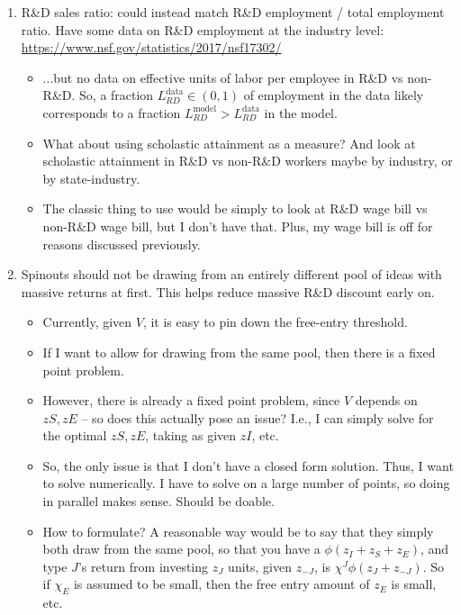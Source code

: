\documentclass[12pt,english]{article}
\theoremstyle{remark}
\begin{document}
\begin{enumerate}
	\item R\&D sales ratio: could instead match R\&D employment / total employment ratio. Have some data on R\&D employment at the industry level: \linebreak \href{https://www.nsf.gov/statistics/2017/nsf17302/}{https://www.nsf.gov/statistics/2017/nsf17302/}
	\begin{itemize}
		\item ...but no data on effective units of labor per employee in R\&D vs non-R\&D. So, a fraction $L_{RD}^{\textrm{data}} \in (0,1)$ of employment in the data likely corresponds to a fraction $L_{RD}^{\textrm{model}} > L_{RD}^{\textrm{data}}$ in the model.
		\item What about using scholastic attainment as a measure? And look at scholastic attainment in R\&D vs non-R\&D workers maybe by industry, or by state-industry. 
		\item The classic thing to use would be simply to look at R\&D wage bill vs non-R\&D wage bill, but I don't have that. Plus, my wage bill is off for reasons discussed previously.
	\end{itemize}
	\item Spinouts should not be drawing from an entirely different pool of ideas with massive returns at first. This helps reduce massive R\&D discount early on.
	\begin{itemize}
		\item Currently, given $V$, it is easy to pin down the free-entry threshold. 
		\item If I want to allow for drawing from the same pool, then there is a fixed point problem.
		\item However, there is already a fixed point problem, since $V$ depends on $zS,zE$ -- so does this actually pose an issue? I.e., I can simply solve for the optimal $zS,zE$, taking as given $zI$, etc.
		\item So, the only issue is that I don't have a closed form solution. Thus, I want to solve numerically. I have to solve on a large number of points, so doing in parallel makes sense. Should be doable. 
		\item How to formulate? A reasonable way would be to say that they simply both draw from the same pool, so that you have a $\phi(z_I + z_S + z_E)$, and type $J$'s return from investing $z_J$ units, given $z_{-J}$, is $\chi^J \phi(z_J + z_{-J})$. So if $\chi_E$ is assumed to be small, then the free entry amount of $z_E$ is small, etc.

\end{itemize}
\end{enumerate}
\end{document}
